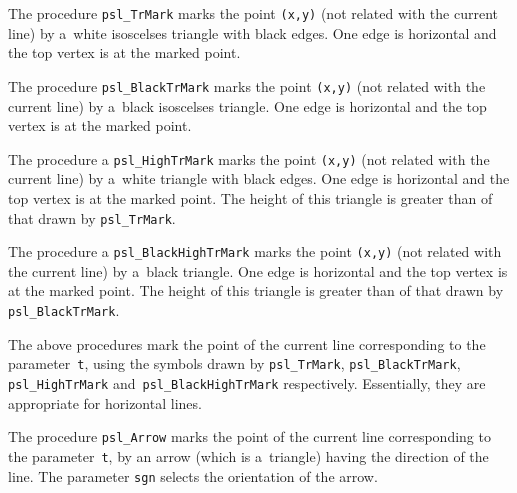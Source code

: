 \vspace{\bigskipamount}
The procedure \texttt{psl\_TrMark} marks the point \texttt{(x,y)} (not
related with the current line) by a~white isoscelses triangle with black edges.
One edge is horizontal and the top vertex is at the marked point.

\vspace{\bigskipamount}
The procedure \texttt{psl\_BlackTrMark} marks the point \texttt{(x,y)}
(not related with the current line) by a~black isoscelses triangle.
One edge is horizontal and the top vertex is at the marked point.

\vspace{\bigskipamount}
The procedure a \texttt{psl\_HighTrMark} marks the point \texttt{(x,y)}
(not related with the current line) by a~white triangle with black edges.
One edge is horizontal and the top vertex is at the marked point.
The height of this triangle is greater than of that drawn by
\texttt{psl\_TrMark}.

\vspace{\bigskipamount}
The procedure a \texttt{psl\_BlackHighTrMark} marks the point \texttt{(x,y)}
(not related with the current line) by a~black triangle.
One edge is horizontal and the top vertex is at the marked point.
The height of this triangle is greater than of that drawn by
\texttt{psl\_BlackTrMark}.

\vspace{\bigskipamount}
The above procedures mark the point of the current line
corresponding to the parameter~\texttt{t}, using the
symbols drawn by \texttt{psl\_TrMark},
\texttt{psl\_BlackTrMark}, \texttt{psl\_HighTrMark}
and~\texttt{psl\_BlackHighTrMark} respectively. Essentially, they are
appropriate for horizontal lines.

\vspace{\bigskipamount}
The procedure \texttt{psl\_Arrow} marks the point of the current line
corresponding to the parameter~\texttt{t}, by an arrow (which is a~triangle)
having the direction of the line.
The parameter \texttt{sgn} selects the orientation of the arrow.

